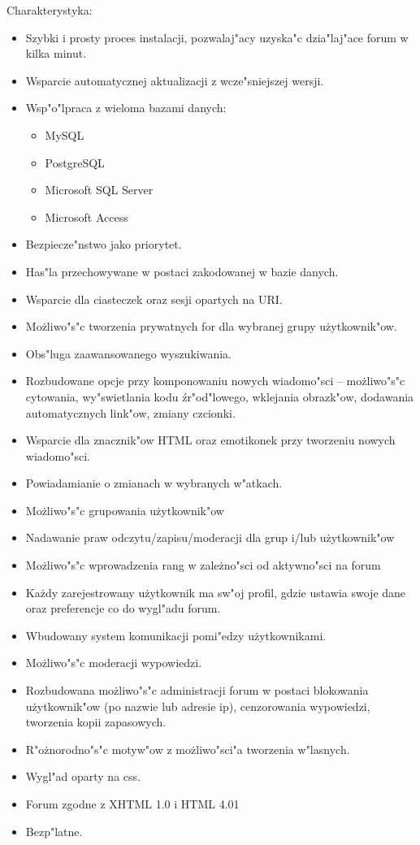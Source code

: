 \documentclass[12pt,a4paper,twoside]{article}
\begin{document}
Charakterystyka:
\begin{itemize}
\item	Szybki i prosty proces instalacji, pozwalaj"acy uzyska"c dzia"laj"ace forum w kilka minut.
\item	Wsparcie automatycznej aktualizacji z wcze"sniejszej wersji.
\item	Wsp"o"lpraca z wieloma bazami danych:
\begin{itemize}
    \item	MySQL
    \item	PostgreSQL
    \item	Microsoft SQL Server
    \item	Microsoft Access 
\end{itemize}
\item	Bezpiecze"nstwo jako priorytet.
\item	Has"la przechowywane w postaci zakodowanej w bazie danych.
\item	Wsparcie dla ciasteczek oraz sesji opartych na URI.
\item	Mo\.zliwo"s"c tworzenia prywatnych for dla wybranej grupy u\.zytkownik"ow.
\item	Obs"luga zaawansowanego wyszukiwania.
\item	Rozbudowane opcje przy komponowaniu nowych wiadomo"sci -- mo\.zliwo"s"c cytowania, wy"swietlania kodu \'zr"od"lowego, wklejania obrazk"ow, dodawania automatycznych link"ow, zmiany czcionki.
\item	Wsparcie dla znacznik"ow HTML oraz emotikonek przy tworzeniu nowych wiadomo"sci.
\item	Powiadamianie o zmianach w wybranych w"atkach.
\item	Mo\.zliwo"s"c grupowania u\.zytkownik"ow
\item	Nadawanie praw odczytu/zapisu/moderacji dla grup i/lub u\.zytkownik"ow
\item	Mo\.zliwo"s"c wprowadzenia rang w zale\.zno"sci od aktywno"sci na forum
\item	Ka\.zdy zarejestrowany u\.zytkownik ma sw"oj profil, gdzie ustawia swoje dane oraz preferencje co do wygl"adu forum.
\item	Wbudowany system komunikacji pomi"edzy u\.zytkownikami.
\item	Mo\.zliwo"s"c moderacji wypowiedzi.
\item	Rozbudowana mo\.zliwo"s"c administracji forum w postaci blokowania u\.zytkownik"ow (po nazwie lub adresie ip), cenzorowania wypowiedzi, tworzenia kopii zapasowych.
\item	R"o\.znorodno"s"c motyw"ow z mo\.zliwo"sci"a tworzenia w"lasnych.
\item	Wygl"ad oparty na css.
\item	Forum zgodne z XHTML 1.0 i HTML 4.01
\item	Bezp"latne.
\end{itemize}
\end{document}
